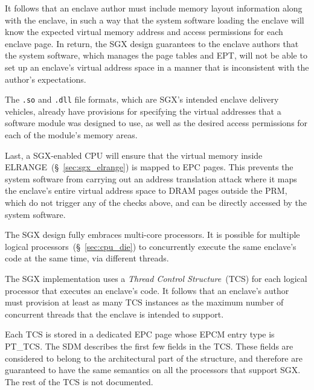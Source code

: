 It follows that an enclave author must include memory layout information along
with the enclave, in such a way that the system software loading the enclave
will know the expected virtual memory address and access permissions for each
enclave page. In return, the SGX design guarantees to the enclave authors that
the system software, which manages the page tables and EPT, will not be able to
set up an enclave's virtual address space in a manner that is inconsistent with
the author's expectations.

The \texttt{.so} and \texttt{.dll} file formats, which are SGX's intended
enclave delivery vehicles, already have provisions for specifying the virtual
addresses that a software module was designed to use, as well as the desired
access permissions for each of the module's memory areas.

Last, a SGX-enabled CPU will ensure that the virtual memory inside
ELRANGE~(\S~\ref{sec:sgx_elrange}) is mapped to EPC pages. This prevents the
system software from carrying out an address translation attack where it maps
the enclave's entire virtual address space to DRAM pages outside the PRM, which
do not trigger any of the checks above, and can be directly accessed by the
system software.


\label{sec:sgx_tcs}


The SGX design fully embraces multi-core processors. It is possible for
multiple logical processors~(\S~\ref{sec:cpu_die}) to concurrently execute the
same enclave's code at the same time, via different threads.

The SGX implementation uses a \textit{Thread Control Structure}~(TCS) for each
logical processor that executes an enclave's code. It follows that an enclave's
author must provision at least as many TCS instances as the maximum number of
concurrent threads that the enclave is intended to support.

Each TCS is stored in a dedicated EPC page whose EPCM entry type is PT\_TCS.
The SDM describes the first few fields in the TCS. These fields are considered
to belong to the architectural part of the structure, and therefore are
guaranteed to have the same semantics on all the processors that support SGX.
The rest of the TCS is not documented.


